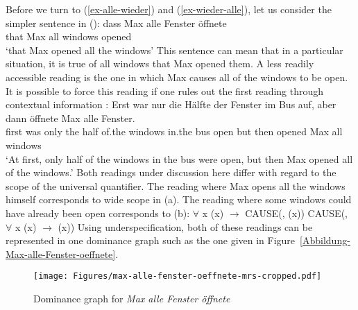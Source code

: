 \addlines
Before we turn to (\ref{ex-alle-wieder}) and (\ref{ex-wieder-alle}), let us consider the simpler sentence in ():
\ea
\gll dass Max alle Fenster öffnete\\
	 that Max all windows opened\\
\glt `that Max opened all the windows'
\z
This sentence can mean that in a particular situation, it is true of all windows that Max opened them.
A less readily accessible reading is the one in which Max causes all of the windows to be open. It is possible
to force this reading if one rules out the first reading through contextual information \citep{Egg99a}:
\ea
\gll Erst war nur die Hälfte der Fenster im Bus auf, aber dann öffnete Max alle Fenster.\\
     first was only the half of.the windows in.the bus open but then opened Max all windows\\
\glt `At first, only half of the windows in the bus were open, but then Max opened all of the windows.'
\z
Both readings under discussion here differ with regard to the scope of the universal quantifier. The reading where
Max opens all the windows himself corresponds to wide scope in (a). The reading where some windows could
have already been open corresponds to (b):
\eal
\ex $\forall$ x (x) $\to$ CAUSE(, (x))
\ex CAUSE(, $\forall$ x (x) $\to$ (x))
\zl
Using underspecification, both of these readings can be represented in one dominance graph such as
the one given in Figure~\vref{Abbildung-Max-alle-Fenster-oeffnete}.
\begin{figure}
\centering
\texttt{[image: Figures/max-alle-fenster-oeffnete-mrs-cropped.pdf]}
\caption{Dominance graph for \emph{Max alle Fenster öffnete}\label{Abbildung-Max-alle-Fenster-oeffnete}}
\end{figure}%
